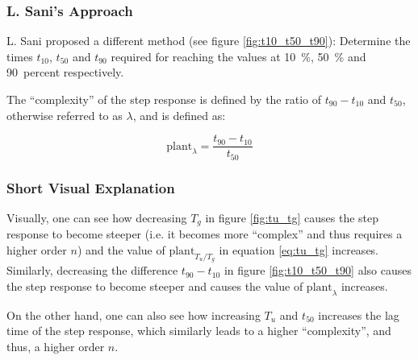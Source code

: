 \subsubsection*{L. Sani's Approach}

L.  Sani  proposed   a  different  method  (see  figure  \ref{fig:t10_t50_t90}):
Determine the  times  $t_{10}$,  $t_{50}$ and $t_{90}$ required for reaching the
values   at    \SI{10}{\percent},    \SI{50}{\percent}    and   \SI{90}{percent}
respectively.

The   ``complexity''   of  the  step  response  is  defined  by  the  ratio   of
$t_{90}-t_{10}$ and $t_{50}$, otherwise referred to as $\lambda$, and is defined
as:

\begin{equation}
    \textrm{plant}_{\lambda} = \frac{t_{90}-t_{10}}{t_{50}}
    \label{eq:t10_t50_t90}
\end{equation}


\subsubsection*{Short Visual Explanation}

Visually, one can see how decreasing $T_g$ in figure \ref{fig:tu_tg}  causes the
step  response  to become steeper (i.e. it becomes  more  ``complex''  and  thus
requires  a  higher  order  $n$)  and the value of $\textrm{plant}_{T_u/T_g}$ in
equation  \ref{eq:tu_tg}  increases.   Similarly,   decreasing   the  difference
$t_{90}-t_{10}$ in figure \ref{fig:t10_t50_t90} also causes the step response to
become  steeper  and causes the value of  $\textrm{plant}_{\lambda}$  increases.

On the other hand, one can also see how increasing  $T_u$ and $t_{50}$ increases
the  lag  time  of  the  step  response,  which  similarly  leads  to  a  higher
``complexity'', and thus, a higher order $n$.

